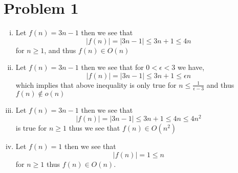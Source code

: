 \documentclass[12pt]{report}
\begin{document}
\maketitle

\section*{Problem 1}
\begin{enumerate}[(i)]
    \item Let $f(n) = 3n-1$ then we see that
    \begin{equation*}
        |f(n)| = |3n-1| \leq 3n + 1 \leq 4n
    \end{equation*}
    for $n \geq 1$, and thus $f(n) \in O(n)$
    \item Let $f(n) = 3n-1$ then we see that for $0 < \epsilon < 3 $ we have,
    \begin{equation*}
        |f(n)| = |3n-1| \leq 3n + 1 \leq \epsilon n  
    \end{equation*}
    which implies that above inequality is only true for $n \leq \frac{1}{\epsilon - 3}$ and thus $f(n) \not\in o(n)$
    \item Let $f(n) = 3n-1$ then we see that 
    \begin{equation*}
        |f(n)| = |3n-1| \leq 3n + 1 \leq 4n \leq 4n^2
    \end{equation*}
    is true for $n \geq 1$ thus we see that $f(n) \in O(n^2)$
    \item Let $f(n) = 1$ then we see that 
    \begin{equation*}
        |f(n)| = 1 \leq n
    \end{equation*}
    for $n \geq 1$ thus $f(n) \in O(n)$.
\end{enumerate}
\end{document}
